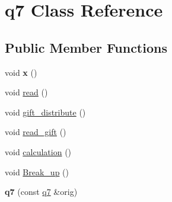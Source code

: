 \hypertarget{classq7}{\section{q7 Class Reference}
\label{classq7}
}
\subsection*{Public Member Functions}
\begin{DoxyCompactItemize}
\item 
\hypertarget{classq7_aeb9abe50b3d09264baec37c1e6129ba2}{void {\bfseries x} ()}\label{classq7_aeb9abe50b3d09264baec37c1e6129ba2}

\item 
void \hyperlink{classq7_af98afaf02a3fd56fe8cd967c9cc1bba5}{read} ()
\item 
void \hyperlink{classq7_a4668f14cddc7f8ccccdd78587521bace}{gift\-\_\-distribute} ()
\item 
void \hyperlink{classq7_ac0598293e653a56f572548691d5f629d}{read\-\_\-gift} ()
\item 
void \hyperlink{classq7_a34537ee53a90513ef1791420d7dfcccd}{calculation} ()
\item 
void \hyperlink{classq7_ab4fd205d1d025aee381699a81ea8cbeb}{Break\-\_\-up} ()
\item 
\hypertarget{classq7_a48080ab976c275ae11556b4bb07c1eea}{{\bfseries q7} (const \hyperlink{classq7}{q7} \&orig)}\label{classq7_a48080ab976c275ae11556b4bb07c1eea}

\end{DoxyCompactItemize}
